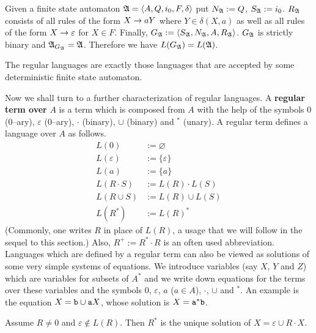 Given a finite state automaton $\mathfrak{A} = \langle A, Q, i_0, F, \delta\rangle$ 
put $N_{\mathfrak{A}} := Q$, $S_{\mathfrak{A}} := i_0$. $R_{\mathfrak{A}}$ consists of all 
rules of the form $X \rightarrow a Y$ where $Y \in \delta(X,a)$ as well 
as all rules of the form $X \rightarrow \varepsilon$ for $X \in F$. Finally, 
$G_{\mathfrak{A}} := \langle S_{\mathfrak{A}}, N_{\mathfrak{A}}, A, R_{\mathfrak{A}}\rangle$. 
$G_{\mathfrak{A}}$ is strictly binary and $\mathfrak{A}_{G_{\mathfrak{A}}} = \mathfrak{A}$. 
Therefore we have $L(G_{\mathfrak{A}}) = L(\mathfrak{A})$.
\begin{thm}
The regular languages are exactly those languages that are
accepted by some deterministic finite state automaton.
\proofend
\end{thm}
\newcommand{\nll}{0}
Now we shall turn to a further characterization of regular
languages.
A \textbf{regular term over} $A$ is a term which is composed from $A$
with the help of the symbols $\nll$ (0--ary), $\varepsilon$
(0--ary), $\cdot$ (binary), $\cup$ (binary) and $^{\ast}$ (unary).
A regular term defines a language over $A$ as follows.
\index{$\cdot$, $\cup$, $^{\ast}$}%
\begin{subequations}
\begin{align}
L(\nll)        & := \varnothing \\
L(\varepsilon)  & := \{\varepsilon\} \\
L(a)         & := \{a\} \\
L(R \cdot S) & := L(R) \cdot L(S) \\
L(R \cup S)  & := L(R) \cup L(S) \\
L(R^{\ast})  & := L(R)^{\ast}
\end{align}
\end{subequations}
(Commonly, one writes $R$ in place of $L(R)$, a usage that we will
follow in the sequel to this section.) Also, 
\index{$^+$}%
$R^+ := R^{\ast} \cdot R$ is an often used abbreviation.
Languages which are defined by a regular term can also be viewed
as solutions of some very simple systems of equations. We introduce
variables (say $X$, $Y$ and $Z$) which are variables for subsets
of $A^{\ast}$ and we write down equations for the terms over
these variables and the symbols $\nll$, $\varepsilon$,
$a$ ($a \in A$), $\cdot$, $\cup$ and $^{\ast}$. An example is the
equation $X = \mbox{\tt b} \cup \mbox{\tt a} X$, whose solution is
$X = \mbox{\tt a}^{\ast}\mbox{\tt b}$.
\begin{lem}
Assume $R \neq 0$ and $\varepsilon \not\in L(R)$.
Then $R^{\ast}$ is the unique solution of
$X = \varepsilon \cup R \cdot X$.
\end{lem}

